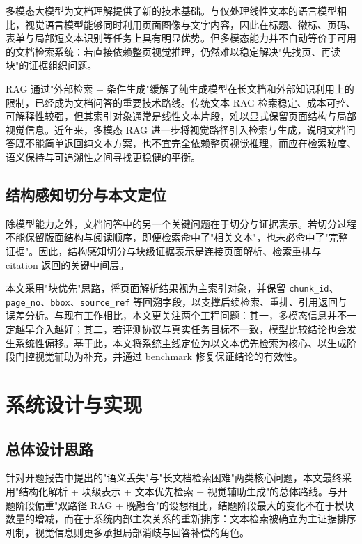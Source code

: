 \documentclass{SYSUReport}
\begin{document}
多模态大模型为文档理解提供了新的技术基础。与仅处理线性文本的语言模型相比，视觉语言模型能够同时利用页面图像与文字内容，因此在标题、徽标、页码、表单与局部短文本识别等任务上具有明显优势。但多模态能力并不自动等价于可用的文档检索系统：若直接依赖整页视觉推理，仍然难以稳定解决"先找页、再读块"的证据组织问题。

RAG 通过"外部检索 + 条件生成"缓解了纯生成模型在长文档和外部知识利用上的限制，已经成为文档问答的重要技术路线。传统文本 RAG 检索稳定、成本可控、可解释性较强，但其索引对象通常是线性文本片段，难以显式保留页面结构与局部视觉信息。近年来，多模态 RAG 进一步将视觉路径引入检索与生成，说明文档问答既不能简单退回纯文本方案，也不宜完全依赖整页视觉推理，而应在检索粒度、语义保持与可追溯性之间寻找更稳健的平衡。

\subsection{结构感知切分与本文定位}

除模型能力之外，文档问答中的另一个关键问题在于切分与证据表示。若切分过程不能保留版面结构与阅读顺序，即便检索命中了"相关文本"，也未必命中了"完整证据"。因此，结构感知切分与块级证据表示是连接页面解析、检索重排与 citation 返回的关键中间层。

本文采用"块优先"思路，将页面解析结果视为主索引对象，并保留 \texttt{chunk\_id}、\texttt{page\_no}、\texttt{bbox}、\texttt{source\_ref} 等回溯字段，以支撑后续检索、重排、引用返回与误差分析。与现有工作相比，本文更关注两个工程问题：其一，多模态信息并不一定越早介入越好；其二，若评测协议与真实任务目标不一致，模型比较结论也会发生系统性偏移。基于此，本文将系统主线定位为以文本优先检索为核心、以生成阶段门控视觉辅助为补充，并通过 benchmark 修复保证结论的有效性。

\section{系统设计与实现}

\subsection{总体设计思路}

针对开题报告中提出的"语义丢失"与"长文档检索困难"两类核心问题，本文最终采用"结构化解析 + 块级表示 + 文本优先检索 + 视觉辅助生成"的总体路线。与开题阶段偏重"双路径 RAG + 晚融合"的设想相比，结题阶段最大的变化不在于模块数量的增减，而在于系统内部主次关系的重新排序：文本检索被确立为主证据排序机制，视觉信息则更多承担局部消歧与回答补偿的角色。
\end{document}
